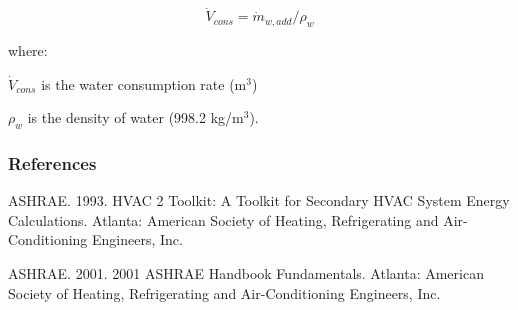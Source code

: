\begin{equation}
{\dot V_{cons}} = {\dot m_{w,add}}/{\rho_w}
\end{equation}

where:

\({\dot V_{cons}}\) is the water consumption rate (m\(^{3}\))

\({\rho_w}\) is the density of water (998.2 kg/m\(^{3}\)).

\subsubsection{References}\label{references-003}

ASHRAE. 1993. HVAC 2 Toolkit: A Toolkit for Secondary HVAC System Energy Calculations. Atlanta: American Society of Heating, Refrigerating and Air-Conditioning Engineers, Inc.

ASHRAE. 2001. 2001 ASHRAE Handbook Fundamentals. Atlanta: American Society of Heating, Refrigerating and Air-Conditioning Engineers, Inc.
